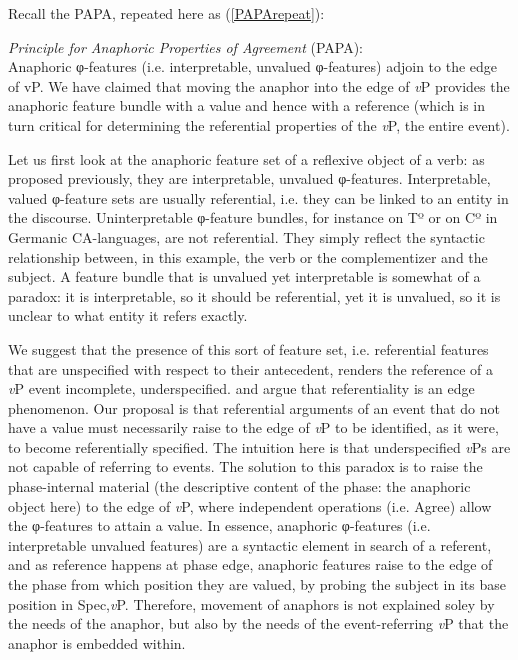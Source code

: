 \documentclass[output=paper
,modfonts
,nonflat
]{langsci/langscibook}
\begin{document}
Recall the PAPA, repeated here as (\ref{PAPArepeat}): 

\ea \label{PAPArepeat} \textit{Principle for Anaphoric Properties of Agreement}  (PAPA):\\
Anaphoric φ-features (i.e. interpretable, unvalued φ-features) adjoin to the edge of vP.
\z
\noindent We have claimed that moving the anaphor into the edge of \textit{v}P provides the anaphoric feature bundle with a value and hence with a reference (which is in turn critical for determining the referential properties of the \textit{v}P, the entire event).

Let us first look at the anaphoric feature set of a reflexive object of a verb: as proposed previously, they are interpretable, unvalued φ-features. Interpretable, valued φ-feature sets are usually referential, i.e. they can be linked to an entity in the discourse. Uninterpretable φ-feature bundles, for instance on Tº or on Cº in Germanic CA-languages, are not referential. They simply reflect the syntactic relationship between, in this example, the verb or the complementizer and the subject. A feature bundle that is unvalued yet interpretable is somewhat of a paradox: it is interpretable, so it should be referential, yet it is unvalued, so it is unclear to what entity it refers exactly. 

We suggest that the presence of this sort of feature set, i.e. referential features that are unspecified with respect to their antecedent, renders the reference of a \textit{v}P event incomplete, underspecified. \citet{Hinzen:2012} and \citet{SheehanHinzen:2011} argue that referentiality is an edge phenomenon. Our proposal is that referential arguments of an event that do not have a value must necessarily raise to the edge of \textit{v}P to be identified, as it were, to become referentially specified. The intuition here is that underspecified \textit{v}Ps are not capable of referring to events. The solution to this paradox is to raise the phase-internal material (the descriptive content of the phase: the anaphoric object here) to the edge of \textit{v}P, where independent operations (i.e. Agree) allow the φ-features to attain a value. In essence, anaphoric φ-features (i.e. interpretable unvalued features) are a syntactic element in search of a referent, and as reference happens at phase edge, anaphoric features raise to the edge of the phase from which position they are valued, by probing the subject in its base position in Spec,\textit{v}P. Therefore, movement of anaphors is not explained soley by the needs of the anaphor, but also by the needs of the event-referring \textit{v}P that the anaphor is embedded within.
\end{document}
